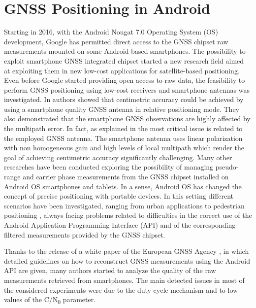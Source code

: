 \section{GNSS Positioning in Android}
Starting in 2016, with the Android Nougat 7.0 Operating System (OS) development, Google has permitted direct access to the GNSS chipset raw measurements mounted on some Android-based smartphones. The possibility to exploit smartphone GNSS integrated chipset started a new research field aimed at exploiting them in new low-cost applications for satellite-based positioning. 
Even before Google started providing open access to  raw data, the feasibility to perform GNSS positioning using low-cost receivers and smartphone antennas was investigated. In \cite{Pesyna2014} authors showed that centimetric accuracy could be achieved by using a smartphone quality GNSS antenna in relative positioning mode. They also demonstrated that the smartphone GNSS observations are highly affected by the multipath error. In fact, as explained in \cite{Humphreys:2016} the most critical issue is related to the employed GNSS  
 antenna. The smartphone antenna uses linear polarization with non homogeneous gain and high levels of local multipath which render the goal of achieving centimetric accuracy  significantly challenging. Many other researches have been conducted exploring the possibility of managing pseudo-range and carrier phase measurements from the GNSS chipset installed on Android OS smartphones and tablets. 
In a sense, Android OS has changed the concept of precise positioning with portable devices. In this setting different scenarios have been investigated, ranging from urban \cite{Masiero2014, wang2015, wang2016a, wang2016b, adjrad2018} applications  to pedestrian positioning  \cite{Fissore2018, presti2017}, always facing problems related to difficulties in the correct use of the Android Application Programming Interface (API) and of the corresponding filtered measurements provided by the GNSS chipset.

Thanks to the release of a white paper  of the European GNSS Agency \cite{GSA_wp:2016}, in which detailed guidelines on how to reconstruct GNSS measurements using the Android API are given, many authors started to analyze the quality of the raw measurements retrieved from smartphones. The main detected issues in most of the considered experiments were due to the duty cycle mechanism and to low values of the C/N\textsubscript{0} \cite{gogoi2019,Liu:2019} parameter.

